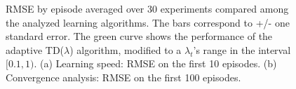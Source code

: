 \documentclass[11pt,A4paper]{article}
\begin{document}
\begin{figure}[h!]
	\centering
	\caption{RMSE by episode averaged over 30 experiments compared among the analyzed learning algorithms. The bars correspond to +/- one standard error. The green curve shows the performance of the adaptive TD($\lambda$) algorithm, modified to a $\lambda_t$'s range in the interval $[0.1, 1)$. (a) Learning speed: RMSE on the first 10 episodes. (b) Convergence analysis: RMSE on the first 100 episodes.}
	\label{fig:RMSE by episode with min lambda}
\end{figure}


\end{document}
